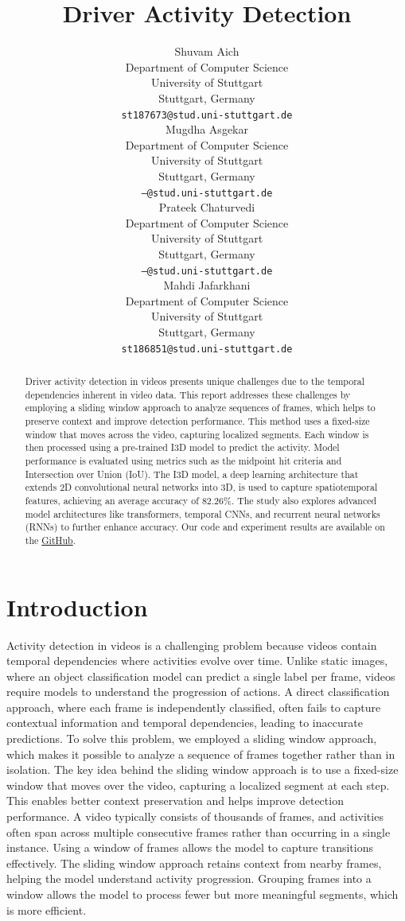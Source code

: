 \documentclass{article}
\title{Driver Activity Detection}
\author{%
  Shuvam Aich \\
  Department of Computer Science\\
  University of Stuttgart\\
  Stuttgart, Germany \\
  \texttt{st187673@stud.uni-stuttgart.de} \\
  \And
  Mugdha Asgekar \\
  Department of Computer Science\\
  University of Stuttgart\\
  Stuttgart, Germany \\
  \texttt{---@stud.uni-stuttgart.de} \\
  \AND
  Prateek Chaturvedi \\
  Department of Computer Science\\
  University of Stuttgart\\
  Stuttgart, Germany \\
  \texttt{---@stud.uni-stuttgart.de} \\
  \And
  Mahdi Jafarkhani \\
  Department of Computer Science\\
  University of Stuttgart\\
  Stuttgart, Germany \\
  \texttt{st186851@stud.uni-stuttgart.de} \\
}
\begin{document}
\maketitle


\begin{abstract}
Driver activity detection in videos presents unique challenges due to the temporal dependencies inherent in video data. This report addresses these challenges by employing a sliding window approach to analyze sequences of frames, which helps to preserve context and improve detection performance. This method uses a fixed-size window that moves across the video, capturing localized segments. Each window is then processed using a pre-trained I3D model to predict the activity. Model performance is evaluated using metrics such as the midpoint hit criteria and Intersection over Union (IoU). The I3D model, a deep learning architecture that extends 2D convolutional neural networks into 3D, is used to capture spatiotemporal features, achieving an average accuracy of 82.26\%. The study also explores advanced model architectures like transformers, temporal CNNs, and recurrent neural networks (RNNs) to further enhance accuracy. Our code and experiment results are available on
the \href{https://github.com/M-Jafarkhani/DriveAndActInferenceDemo}{GitHub}.
\end{abstract}


\section{Introduction}

Activity detection in videos is a challenging problem because videos contain temporal dependencies where activities evolve over time. Unlike static images, where an object classification model can predict a single label per frame, videos require models to understand the progression of actions. A direct classification approach, where each frame is independently classified, often fails to capture contextual information and temporal dependencies, leading to inaccurate predictions. To solve this problem, we employed a sliding window approach, which makes it possible to analyze a sequence of frames together rather than in isolation. The key idea behind the sliding window approach is to use a fixed-size window that moves over the video, capturing a localized segment at each step. This enables better context preservation and helps improve detection performance. A video typically consists of thousands of frames, and activities often span across multiple consecutive frames rather than occurring in a single instance. Using a window of frames allows the model to capture transitions effectively. The sliding window approach retains context from nearby frames, helping the model understand activity progression. Grouping frames into a window allows the model to process fewer but more meaningful segments, which is more efficient.
\end{document}
